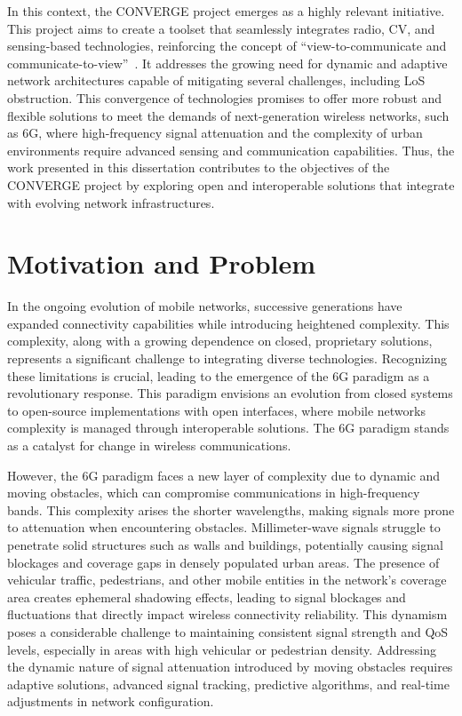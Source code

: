 In this context, the CONVERGE project emerges as a highly relevant initiative.
This project aims to create a toolset that seamlessly integrates radio, CV, and sensing-based technologies, reinforcing the concept of “view-to-communicate and communicate-to-view”~\cite{converge_site}.
It addresses the growing need for dynamic and adaptive network architectures capable of mitigating several challenges, including LoS obstruction.
This convergence of technologies promises to offer more robust and flexible solutions to meet the demands of next-generation wireless networks, such as 6G, where high-frequency signal attenuation and the complexity of urban environments require advanced sensing and communication capabilities.
Thus, the work presented in this dissertation contributes to the objectives of the CONVERGE project by exploring open and interoperable solutions that integrate with evolving network infrastructures.

\section{Motivation and Problem}\label{sec:motivation-and-problem}

In the ongoing evolution of mobile networks, successive generations have expanded connectivity capabilities while introducing heightened complexity.
This complexity, along with a growing dependence on closed, proprietary solutions, represents a significant challenge to integrating diverse technologies.
Recognizing these limitations is crucial, leading to the emergence of the 6G paradigm as a revolutionary response.
This paradigm envisions an evolution from closed systems to open-source implementations with open interfaces, where mobile networks complexity is managed through interoperable solutions.
The 6G paradigm stands as a catalyst for change in wireless communications.

However, the 6G paradigm faces a new layer of complexity due to dynamic and moving obstacles,  which can compromise communications in high-frequency bands.
This complexity arises the shorter wavelengths, making signals more prone to attenuation when encountering obstacles.
Millimeter-wave signals struggle to penetrate solid structures such as walls and buildings, potentially causing signal blockages and coverage gaps in densely populated urban areas.
The presence of vehicular traffic, pedestrians, and other mobile entities in the network's coverage area creates ephemeral shadowing effects, leading to signal blockages and fluctuations that directly impact wireless connectivity reliability.
This dynamism poses a considerable challenge to maintaining consistent signal strength and QoS levels, especially in areas with high vehicular or pedestrian density.
Addressing the dynamic nature of signal attenuation introduced by moving obstacles requires adaptive solutions, advanced signal tracking, predictive algorithms, and real-time adjustments in network configuration.

